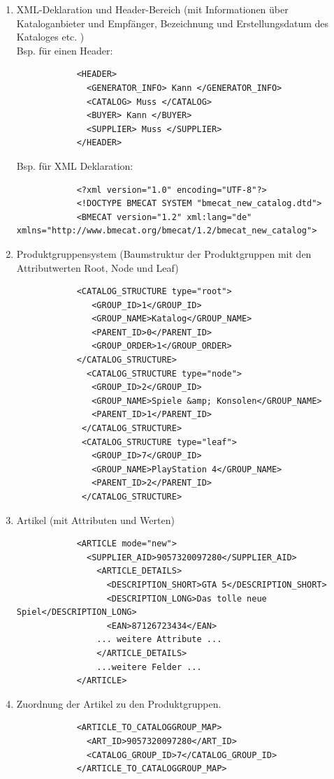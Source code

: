 		\begin{enumerate}
		
			\item XML-Deklaration und Header-Bereich (mit Informationen über Kataloganbieter und Empfänger, Bezeichnung und Erstellungsdatum des Kataloges etc.  )
				\\Bsp. für einen Header:
			\begin{lstlisting}
			<HEADER>
			  <GENERATOR_INFO> Kann </GENERATOR_INFO>
			  <CATALOG> Muss </CATALOG>
			  <BUYER> Kann </BUYER>
			  <SUPPLIER> Muss </SUPPLIER>
			</HEADER>
			\end{lstlisting}
			Bsp. für XML Deklaration:
			\begin{lstlisting}
			<?xml version="1.0" encoding="UTF-8"?>
			<!DOCTYPE BMECAT SYSTEM "bmecat_new_catalog.dtd">
			<BMECAT version="1.2" xml:lang="de" xmlns="http://www.bmecat.org/bmecat/1.2/bmecat_new_catalog">
			\end{lstlisting}\pagebreak
			\item Produktgruppensystem (Baumstruktur der Produktgruppen mit den Attributwerten Root, Node und Leaf)
			\begin{lstlisting}
			<CATALOG_STRUCTURE type="root">
			   <GROUP_ID>1</GROUP_ID>
			   <GROUP_NAME>Katalog</GROUP_NAME>
			   <PARENT_ID>0</PARENT_ID>
			   <GROUP_ORDER>1</GROUP_ORDER>
			</CATALOG_STRUCTURE>
			  <CATALOG_STRUCTURE type="node">
			   <GROUP_ID>2</GROUP_ID>
			   <GROUP_NAME>Spiele &amp; Konsolen</GROUP_NAME>
			   <PARENT_ID>1</PARENT_ID>
			 </CATALOG_STRUCTURE>
			 <CATALOG_STRUCTURE type="leaf">
			   <GROUP_ID>7</GROUP_ID>
			   <GROUP_NAME>PlayStation 4</GROUP_NAME>
			   <PARENT_ID>2</PARENT_ID>
			 </CATALOG_STRUCTURE>
			\end{lstlisting}
			
			
			
			\item Artikel (mit Attributen und Werten)
			
			\begin{lstlisting}
			<ARTICLE mode="new">
			  <SUPPLIER_AID>9057320097280</SUPPLIER_AID>
			    <ARTICLE_DETAILS>
			      <DESCRIPTION_SHORT>GTA 5</DESCRIPTION_SHORT>
			      <DESCRIPTION_LONG>Das tolle neue Spiel</DESCRIPTION_LONG>
			      <EAN>87126723434</EAN>
				... weitere Attribute ...
			    </ARTICLE_DETAILS>
				...weitere Felder ...
			</ARTICLE>
			\end{lstlisting}
			
	
			\item Zuordnung der Artikel zu den Produktgruppen.
			\begin{lstlisting}
			<ARTICLE_TO_CATALOGGROUP_MAP>
			  <ART_ID>9057320097280</ART_ID>
			  <CATALOG_GROUP_ID>7</CATALOG_GROUP_ID>
			</ARTICLE_TO_CATALOGGROUP_MAP>
			\end{lstlisting}
		
		\end{enumerate}
		
